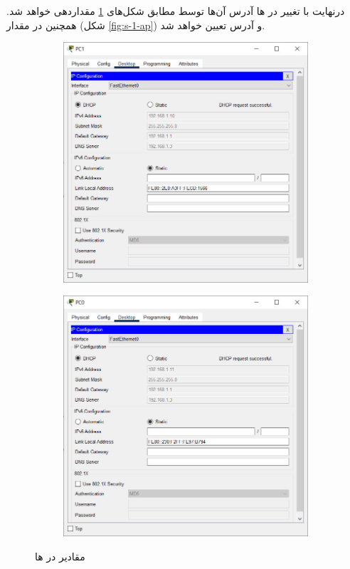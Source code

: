 \documentclass{article}
\begin{document}
درنهایت با تغییر  در  ها آدرس آن‌ها توسط  مطابق شکل‌های \ref{fig:s-1-pc} مقداردهی خواهد شد. همچنین در  مقدار  (شکل \ref{fig:s-1-ap}) و آدرس تعیین خواهد شد.
\begin{figure}
	\centering
	 \begin{subfigure}{.4\columnwidth}
		   \centering
		   \includegraphics[width=\columnwidth]{figs/s-1-pc-1.jpg}
	\end{subfigure}%
	\begin{subfigure}{.4\columnwidth}
		\centering
		\includegraphics[width=\columnwidth]{figs/s-1-pc-2.jpg}
	\end{subfigure}
	\caption{مقادیر  در  ها}
	\label{fig:s-1-pc}
\end{figure}
\end{document}
